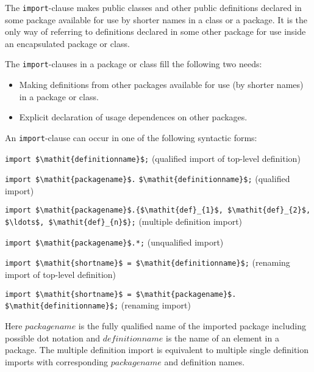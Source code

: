 The \lstinline!import!-clause makes public classes and other public definitions declared in some package available for use by shorter names in a class or a package.
It is the only way of referring to definitions declared in some other package for use inside an encapsulated package or class.

\begin{nonnormative}
The \lstinline!import!-clauses in a package or class fill the following two needs:
\begin{itemize}
\item
  Making definitions from other packages available for use (by shorter names) in a package or class.
\item
  Explicit declaration of usage dependences on other packages.
\end{itemize}
\end{nonnormative}

An \lstinline!import!-clause can occur in one of the following syntactic forms:


\lstinline!import $\mathit{definitionname}$;! (qualified import of top-level definition)

\lstinline!import $\mathit{packagename}$.!%
\lstinline!$\mathit{definitionname}$;! (qualified import)

\lstinline!import $\mathit{packagename}$.{$\mathit{def}_{1}$, $\mathit{def}_{2}$, $\ldots$, $\mathit{def}_{n}$};! (multiple definition import)

\lstinline!import $\mathit{packagename}$.*;! (unqualified import)

\lstinline!import $\mathit{shortname}$ = $\mathit{definitionname}$;! (renaming import of top-level definition)

\lstinline!import $\mathit{shortname}$ = $\mathit{packagename}$.!%
\lstinline!$\mathit{definitionname}$;! (renaming import)

Here $\mathit{packagename}$ is the fully qualified name of the imported package including possible dot notation and $\mathit{definitionname}$ is the name of an element in a package.
The multiple definition import is equivalent to multiple single definition imports with corresponding $\mathit{packagename}$ and definition names.


